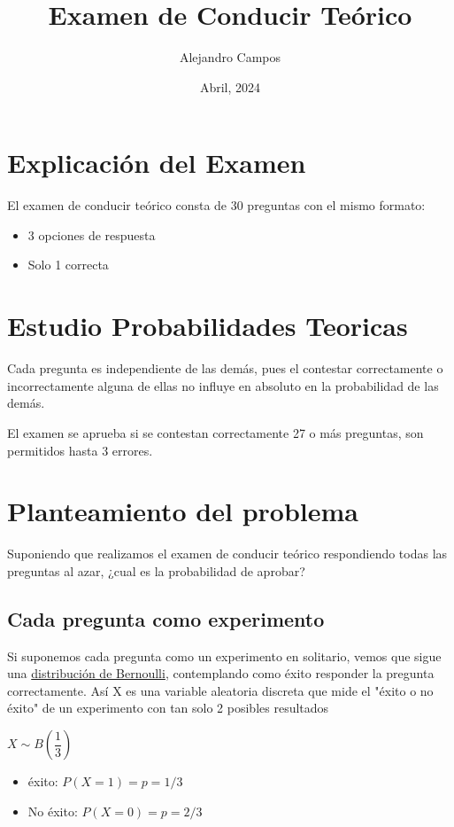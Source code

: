 \documentclass{article}
\title{\textbf{Examen de Conducir Teórico}}
\author{Alejandro Campos}
\date{Abril, 2024}
\begin{document}
\newpage
\section{Explicación del Examen}

El examen de conducir teórico consta de 30 preguntas con el mismo formato:

\begin{itemize}
    \item 3 opciones de respuesta
    \item Solo 1 correcta
\end{itemize} 
\section{Estudio Probabilidades Teoricas}

Cada pregunta es independiente de las demás, pues el contestar correctamente o incorrectamente alguna de ellas no influye en absoluto en la probabilidad de las demás.

El examen se aprueba si se contestan correctamente 27 o más preguntas, son permitidos hasta 3 errores.

\section{Planteamiento del problema}

Suponiendo que realizamos el examen de conducir teórico respondiendo todas las preguntas al azar, ¿cual es la probabilidad de aprobar?

\subsection{Cada pregunta como experimento}
Si suponemos cada pregunta como un experimento en solitario, vemos que sigue una \href{https://es.wikipedia.org/wiki/Distribuci%C3%B3n_Bernoulli}{distribución de Bernoulli}, contemplando como éxito responder la pregunta correctamente. Así X es una variable aleatoria discreta que mide el "éxito o no éxito" de un experimento con tan solo 2 posibles resultados

$X \sim B(\dfrac{1}{3})$

\begin{itemize}
    \item éxito: $P(X=1)=p=1/3$
    \item No éxito: $P(X=0)=p=2/3$
\end{itemize} 
\end{document}
